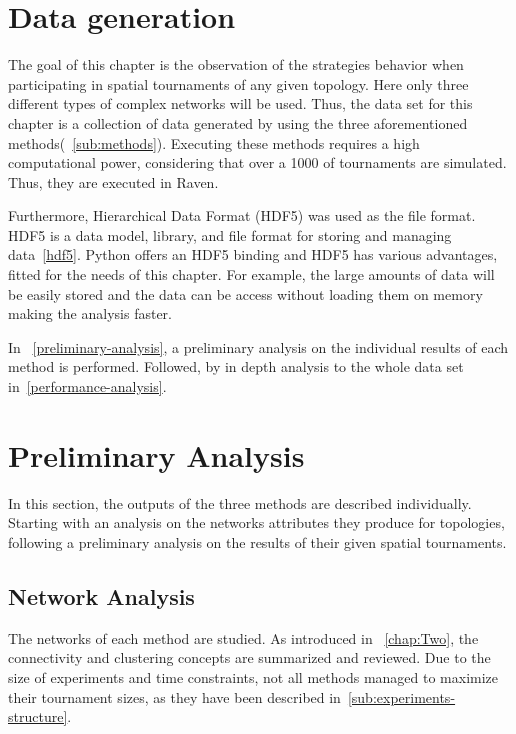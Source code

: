 \section{Data generation}
The goal of this chapter is the observation of the strategies behavior when
participating in spatial tournaments of any given topology. Here only three
different types of complex networks will be used. Thus, the data set for this
chapter is a collection of data generated by using the three aforementioned
methods(~\autoref{sub:methods}). Executing these methods requires a high
computational power, considering that over a 1000 of tournaments are
simulated. Thus, they are executed in Raven.

Furthermore, Hierarchical Data Format (HDF5) was used as the file format.
HDF5 is a data model, library, and file format for storing and managing data~\ref{hdf5}.
Python offers an HDF5 binding and HDF5 has various advantages, fitted for the needs
of this chapter. For example, the large amounts of data will be easily stored
and the data can be access without loading them on memory making the analysis
faster.

In ~\autoref{preliminary-analysis}, a preliminary analysis on the individual results of each method
is performed. Followed, by in depth analysis to the whole data set in~\autoref{performance-analysis}.

\section{Preliminary Analysis}
\label{preliminary-analysis}
In this section, the outputs of the three methods are described individually.
Starting with an analysis on the networks attributes they produce for topologies,
following a preliminary analysis on the results of their given spatial tournaments.


\subsection{Network Analysis}
\label{sub:network-analysis}
The networks of each method are studied. As introduced in ~\autoref{chap:Two}, the
connectivity and clustering concepts are summarized and reviewed. Due to the
size of experiments and time constraints, not all methods managed to
maximize their tournament sizes, as they have been described in~\autoref{sub:experiments-structure}.

